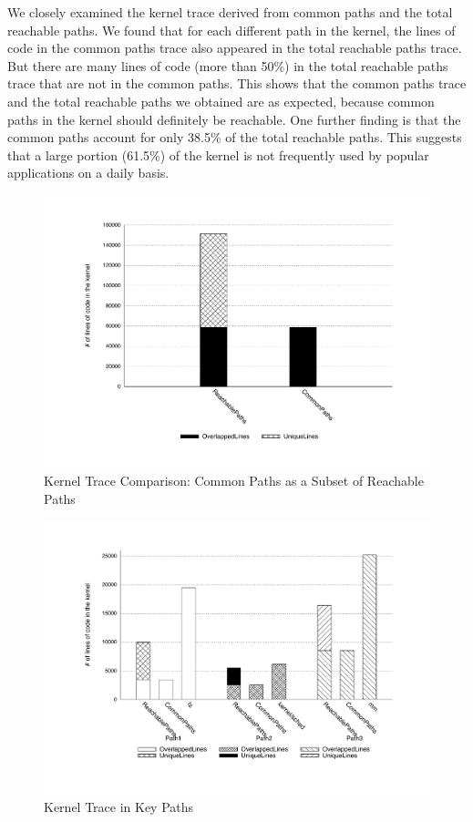 We closely examined the kernel trace derived from common paths
and the total reachable paths. We found that for each different path
in the kernel, the lines of code 
in the common paths trace also appeared in the total reachable paths trace.
But there are many lines of code (more than 50\%) 
in the total reachable paths trace that are not in the common paths. This
shows that the common paths trace and 
the total reachable paths we obtained are as expected, because common paths in
the kernel should definitely be reachable.  
One further finding is that the common paths account
for only 38.5\% of the total reachable paths. 
This suggests that a large portion (61.5\%) of the kernel is not frequently
used by popular applications on a daily basis.

\begin{figure}
\centering
\includegraphics[width=1.0\columnwidth]{diagram/lind_oakland16_diagram_01.pdf}
\caption{Kernel Trace Comparison: Common Paths as a Subset of Reachable
Paths}
\label{fig:subset}
\end{figure}

\begin{figure}
\centering
\includegraphics[width=1.0\columnwidth]{diagram/lind_oakland16_diagram_02.pdf}
\caption{Kernel Trace in Key Paths}
\label{fig:key_paths_trace}
\end{figure}

